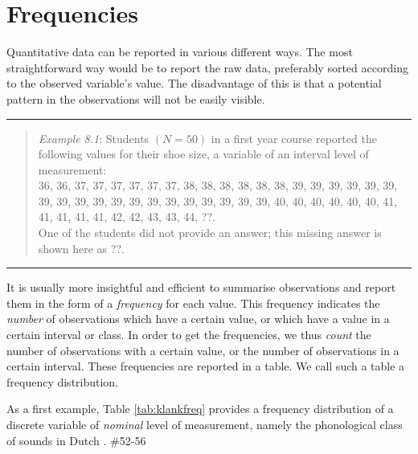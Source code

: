 \documentclass[
]{book}
\begin{document}
\hypertarget{sec:frequencies}{%
\section{Frequencies}\label{sec:frequencies}}

Quantitative data can be reported in various different ways.
The most straightforward way would be to report the raw data, preferably
sorted according to the observed variable's value.
The disadvantage of this is that a potential pattern in the observations
will not be easily visible.

\begin{center}\rule{0.5\linewidth}{0.5pt}\end{center}

\begin{quote}
\emph{Example 8.1}: Students \((N=50)\) in a first year
course reported the following values for their shoe size, a
variable of an interval level of measurement:\\
36, 36, 37, 37, 37, 37, 37, 37, 38, 38, 38, 38, 38, 38, 39, 39, 39, 39,
39, 39, 39, 39, 39, 39, 39, 39, 39, 39, 39, 39, 39, 39, 39, 40, 40, 40,
40, 40, 40, 41, 41, 41, 41, 41, 42, 42, 43, 43, 44, ??.\\
One of the students did not provide an answer; this missing answer is
shown here as ??.
\end{quote}

\begin{center}\rule{0.5\linewidth}{0.5pt}\end{center}

It is usually more insightful and efficient to summarise observations
and report them in the form of a \emph{frequency} for each value.
This frequency indicates the \emph{number} of observations which have a certain value,
or which have a value in a certain interval or class. In order to get
the frequencies, we thus \emph{count} the number of observations with a certain
value, or the number of observations in a certain interval. These
frequencies are reported in a table. We call such a table a
frequency distribution.

As a first example, Table \ref{tab:klankfreq} provides a
frequency distribution of a discrete variable of \emph{nominal} level of measurement,
namely the phonological class of sounds in Dutch \citep{LKCG07}.
\#52-56
\end{document}

